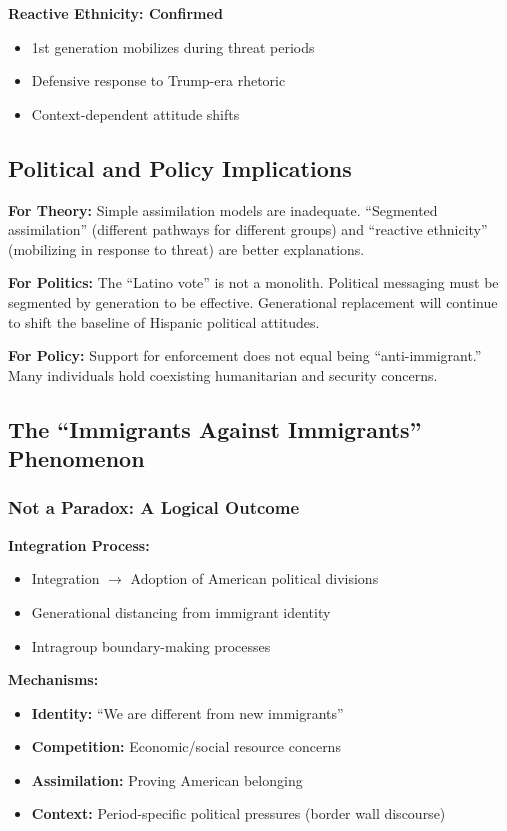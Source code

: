 \documentclass[11pt,letterpaper]{article}
\begin{document}
\textbf{Reactive Ethnicity: Confirmed}
\begin{itemize}
    \item 1st generation mobilizes during threat periods
    \item Defensive response to Trump-era rhetoric
    \item Context-dependent attitude shifts
\end{itemize}

\subsection{Political and Policy Implications}

\textbf{For Theory:} Simple assimilation models are inadequate. ``Segmented assimilation'' (different pathways for different groups) and ``reactive ethnicity'' (mobilizing in response to threat) are better explanations.

\textbf{For Politics:} The ``Latino vote'' is not a monolith. Political messaging must be segmented by generation to be effective. Generational replacement will continue to shift the baseline of Hispanic political attitudes.

\textbf{For Policy:} Support for enforcement does not equal being ``anti-immigrant.'' Many individuals hold coexisting humanitarian and security concerns.

\subsection{The ``Immigrants Against Immigrants'' Phenomenon}

\subsubsection{Not a Paradox: A Logical Outcome}

\textbf{Integration Process:}
\begin{itemize}
    \item Integration $\rightarrow$ Adoption of American political divisions
    \item Generational distancing from immigrant identity
    \item Intragroup boundary-making processes
\end{itemize}

\textbf{Mechanisms:}
\begin{itemize}
    \item \textbf{Identity:} ``We are different from new immigrants''
    \item \textbf{Competition:} Economic/social resource concerns
    \item \textbf{Assimilation:} Proving American belonging
    \item \textbf{Context:} Period-specific political pressures (border wall discourse)
\end{itemize}
\end{document}
